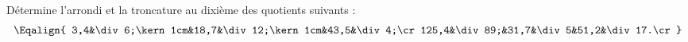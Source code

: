 Détermine l'arrondi et la troncature au dixième des quotients suivants
:
\[\Eqalign{
3,4&\div6;\kern1cm&18,7&\div12;\kern1cm&43,5&\div4;\cr
125,4&\div89;&31,7&\div5&51,2&\div17.\cr
}\]
